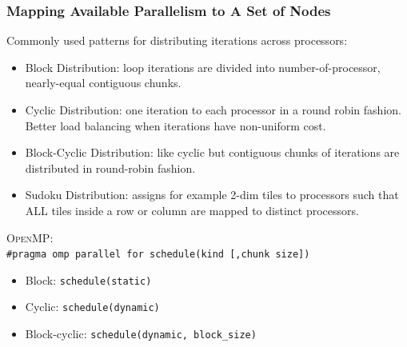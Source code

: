 \documentclass{beamer}
\newcommand{\emp}[1]{\textcolor{DikuRed}{ #1}}
\begin{document}
\begin{frame}[fragile,t]
  \frametitle{Mapping Available Parallelism to A Set of Nodes}

 
Commonly used patterns for distributing iterations across processors:
\begin{itemize}
    \item \emp{Block Distribution:} loop iterations are divided into 
            number-of-processor, nearly-equal contiguous chunks. 
    \item \emp{Cyclic Distribution:} one iteration to each processor
            in a round robin fashion. Better load balancing when
            iterations have non-uniform cost.
    \item \emp{Block-Cyclic Distribution}: like cyclic but contiguous chunks
            of iterations are distributed in round-robin fashion.
    \item \emp{Sudoku Distribution}: assigns for example 2-dim tiles
            to processors such that \alert{ALL} tiles inside a row or column
            are mapped to distinct processors.

\end  {itemize}


\textsc{OpenMP}:\\ 
{\tt \#pragma omp parallel for schedule(kind [,chunk size])}
\begin{itemize}
    \item \emp{Block:}  {\tt schedule(static)}
    \item \emp{Cyclic:} {\tt schedule(dynamic)}
    \item \emp{Block-cyclic:}  {\tt schedule(dynamic, block\_size)}
\end  {itemize}
 

\end{frame}
\end{document}
